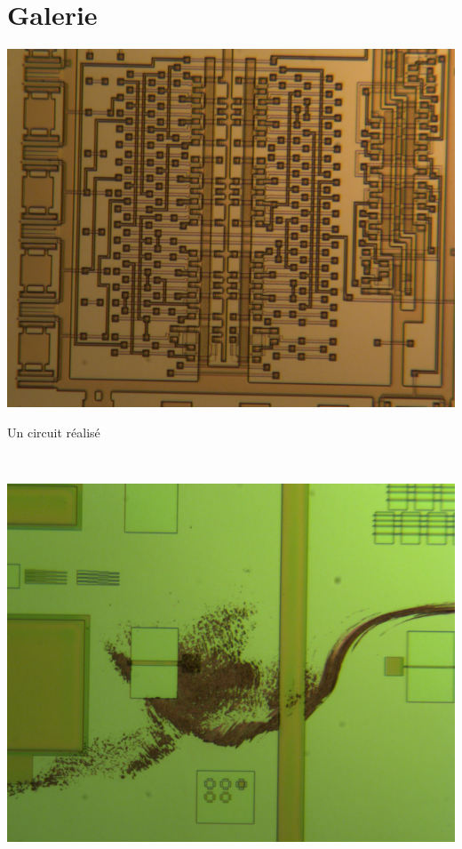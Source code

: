 \documentclass{article}
\begin{document}
\newpage
\section*{Galerie}
    \begin{centering}


    \includegraphics[width=\linewidth-2cm]{circuit_alu.png}

    Un circuit réalisé

    ~

    \includegraphics[width=\linewidth-2cm]{coup_de_pince.png}


\end{centering}
\end{document}
